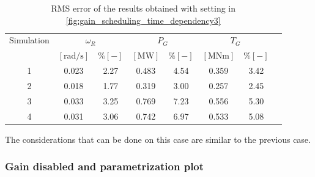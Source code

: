 \begin{table}[htb]
  \caption{RMS error of the results obtained with setting in \autoref{fig:gain_scheduling_time_dependency3}}
  \centering
  \begin{tabular}{cccccccc}
    \toprule
      Simulation & \multicolumn{2}{c}{$\omega_R$} & \multicolumn{2}{c}{$P_G$} & \multicolumn{2}{c}{$T_G$} \\ 
       & $\left[\si{\radian\per\second}\right]$ & $ \% \left[-\right]$ & $\left[\si{\mega\watt}\right]$ & $ \% \left[-\right]$ & $\left[\si{\mega\newton\meter} \right]$ & $ \% \left[-\right]$ \\ \midrule        
     1 & 0.023 & 2.27 & 0.483 & 4.54 & 0.359 & 3.42 \\
     2 & 0.018 & 1.77 & 0.319 & 3.00 & 0.257 & 2.45 \\
     3 & 0.033 & 3.25 & 0.769 & 7.23 & 0.556 & 5.30 \\
     4 & 0.031 & 3.06 & 0.742 & 6.97 & 0.533 & 5.08 \\
     \bottomrule
  \end{tabular}
  \label{tab:res_variable_gains3}
\end{table}

The considerations that can be done on this case are similar to the previous case. 

\subsubsection{Gain disabled and parametrization plot}

